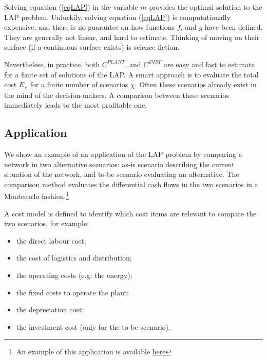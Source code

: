 Solving equation (\ref{eqLAP}) in the variable $m$ provides the optimal solution to the LAP problem. Unluckily, solving equation (\ref{eqLAP}) is computationally expensive, and there is no guarantee on how functions $f$, and $g$ have been defined. They are generally not linear, and hard to estimate. Thinking of moving on their surface (if a continuous surface exists) is science fiction.\par

Nevertheless, in practice, both $C^{PLANT}$, and $C^{DIST}$ are easy and fast to estimate for a finite set of solutions of the LAP. A smart approach is to evaluate the total cost $E_\chi$ for a finite number of scenarios $\chi$. Often these scenarios already exist in the mind of the decision-makers. A comparison between these scenarios immediately leads to the most profitable one.

\subsection{Application}
We show an example of an application of the LAP problem by comparing a network in two alternative scenarios: as-is scenario describing the current situation of the network, and to-be scenario evaluating an alternative. The comparison method evaluates the differential cash flows in the two scenarios in a Montecarlo fashion.\footnote{An example of this application is available \href{https://github.com/aletuf93/logproj/blob/master/examples/DIST_04\%20Location-Allocation\%20problem.ipynb}{here}}  \par

A cost model is defined to identify which cost items are relevant to compare the two scenarios, for example:

\begin{itemize}
    \item the direct labour cost;
    \item the cost of logistics and distribution;
    \item the operating costs (e.g. the energy);
    \item the fixed costs to operate the plant;
    \item the depreciation cost;
    \item the investment cost (only for the to-be scenario).
\end{itemize}

